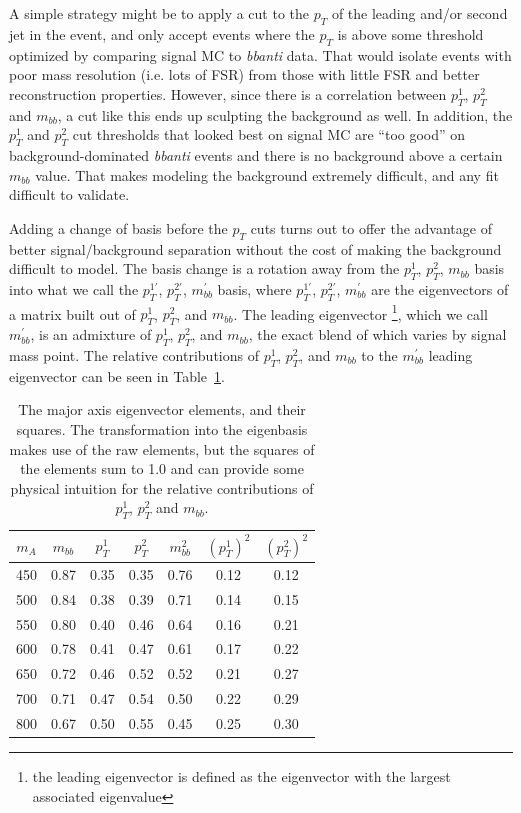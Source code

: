 A simple strategy might be to apply a cut to the $p_T$ of the leading and/or 
second jet in the event, and only accept events where the $p_T$ is above some
threshold optimized by comparing signal MC to \textit{bbanti} data.  
That would isolate events with poor mass resolution (i.e. lots of FSR) from
those with little FSR and better reconstruction properties.  However, since
there is a correlation between $p_T^1$, $p_T^2$ and $m_{bb}$, a cut like
this ends up sculpting the background as well.  In addition, the $p_T^1$ and
$p_T^2$ cut thresholds that looked best on signal MC are ``too good'' on 
background-dominated \textit{bbanti} events and there is no background
above a certain $m_{bb}$ value.  That makes modeling the background extremely 
difficult, and any fit difficult to validate.  

Adding a change of basis before the $p_T$ cuts turns out to offer the advantage
of better signal/background separation without the cost of making the background
difficult to model.  The basis change is a rotation away from the $p_T^1$, 
$p_T^2$, $m_{bb}$ basis into what we call the $p_T^{1'}$, $p_T^{2'}$, $m_{bb}^{'}$
basis, where $p_T^{1'}$, $p_T^{2'}$, $m_{bb}^{'}$ are the eigenvectors of 
a matrix built out of $p_T^1$, $p_T^2$, and $m_{bb}$.  The leading eigenvector 
\footnote{the leading eigenvector is defined as the eigenvector with the largest
associated eigenvalue}, which we call $m_{bb}^{'}$, is an admixture of 
$p_T^1$, $p_T^2$, and $m_{bb}$, the exact blend of which varies by signal mass
point.  The relative contributions of $p_T^1$, $p_T^2$, and $m_{bb}$ to the $m_{bb}^{'}$
leading eigenvector can be seen in Table~\ref{tab:eigenvector_elements}.


\begin{table}
    \center
    \caption{The major axis eigenvector elements, and their squares.  The
    transformation into the eigenbasis makes use of the raw elements, but the
    squares of the elements sum to 1.0 and can provide some physical intuition
    for the relative contributions of $p_T^1$, $p_T^2$ and $m_{bb}$. \label{tab:eigenvector_elements}}
    \begin{tabular}{ c c c c c c c } \hline \hline
        $m_A$ & $m_{bb}$ & $p_T^1$ & $p_T^2$ & $m_{bb}^2$ & $(p_T^{1})^2$ & $(p_T^2)^2$ \\ \hline
        450 & 0.87 & 0.35 & 0.35 & 0.76 & 0.12 & 0.12 \\
        500 & 0.84 & 0.38 & 0.39 & 0.71 & 0.14 & 0.15 \\
        550 & 0.80 & 0.40 & 0.46 & 0.64 & 0.16 & 0.21 \\
        600 & 0.78 & 0.41 & 0.47 & 0.61 & 0.17 & 0.22 \\
        650 & 0.72 & 0.46 & 0.52 & 0.52 & 0.21 & 0.27 \\
        700 & 0.71 & 0.47 & 0.54 & 0.50 & 0.22 & 0.29 \\
        800 & 0.67 & 0.50 & 0.55 & 0.45 & 0.25 & 0.30 \\ 
        \hline
    \end{tabular}
\end{table} 


